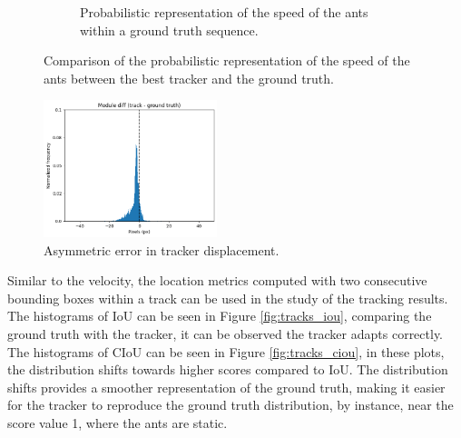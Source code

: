 \begin{figure}[!hp]
\begin{subfigure}[]{0.45\textwidth}
		\caption{\footnotesize{Probabilistic representation of the speed of the ants within a ground truth sequence.}}
		\label{fig:tracks_speed_gt}
	\end{subfigure}
	\caption[Ants speed Normalized histogram]{\footnotesize{Comparison of the probabilistic representation of the speed of the ants between the best tracker and the ground truth.}}
	\label{fig:tracks_speed}
\end{figure}

\begin{figure}[!hp]
    \centering
    \includegraphics[width=0.45\textwidth]{figures/06_results/da/ModuleDiffTrack.png}
    \caption[Asymmetric error in tracker displacement]{\footnotesize{Asymmetric error in tracker displacement.}}
    \label{fig:tracker_module_diff}
\end{figure}

\needspace{0.1\textheight}

{
	Similar to the velocity, the location metrics computed with two consecutive bounding boxes within a track can be used in the study of the tracking results. 
	The histograms of \ac{IoU} can be seen in Figure \ref{fig:tracks_iou}, 
	comparing the ground truth with the tracker, it can be observed the tracker adapts correctly. 
	The histograms of \ac{CIoU} can be seen in Figure \ref{fig:tracks_ciou}, in these plots, 
	the distribution shifts towards higher scores compared to IoU. 
	The distribution shifts provides a smoother representation of the ground truth, making it easier for the tracker to reproduce the ground truth distribution, by instance, near the score value 1, where the ants are static.
}


